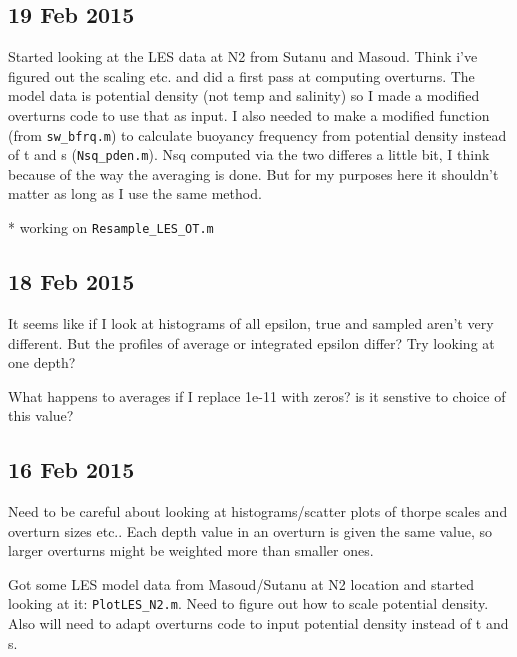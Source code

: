 \documentclass[11pt]{article}
\begin{document}
\clearpage
\newpage
\subsection{19 Feb 2015}

Started looking at the LES data at N2 from Sutanu and Masoud. Think i've figured out the scaling etc. and did a first pass at computing overturns. The model data is potential density (not temp and salinity) so I made a modified overturns code to use that as input. I also needed to make a modified function (from \verb+sw_bfrq.m+) to calculate buoyancy frequency from potential density instead of t and s (\verb+Nsq_pden.m+). Nsq computed via the two differes a little bit, I think because of the way the averaging is done. But for my purposes here it shouldn't matter as long as I use the same method.

* working on \verb+Resample_LES_OT.m+

\clearpage
\newpage
\subsection{18 Feb 2015}

It seems like if I look at histograms of all epsilon, true and sampled aren't very different. But the profiles of average or integrated epsilon differ? Try looking at one depth?


What happens to averages if I replace 1e-11 with zeros? is it senstive to choice of this value?


\clearpage
\newpage
\subsection{16 Feb 2015}

Need to be careful about looking at histograms/scatter plots of thorpe scales and overturn sizes etc.. Each depth value in an overturn is given the same value, so larger overturns might be weighted more than smaller ones. 

\vspace{1cm}


Got some LES model data from Masoud/Sutanu at N2 location and started looking at it:
\verb+PlotLES_N2.m+. Need to figure out how to scale potential density. Also will need to adapt overturns code to input potential density instead of t and s.


\vspace{1cm}
\end{document}
